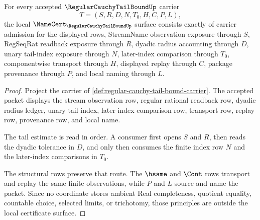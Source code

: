 \begin{theorem}
\label{thm:regular-cauchy-tail-bound-namecert-obligations}
For every accepted $\RegularCauchyTailBoundUp$ carrier
$$
T=(S,R,D,N,T_0,H,C,P,L),
$$
the local $\NameCert_{\RegularCauchyTailBoundUp}$ surface consists exactly of carrier admission for the displayed rows, StreamName observation exposure through $S$, RegSeqRat readback exposure through $R$, dyadic radius accounting through $D$, unary tail-index exposure through $N$, later-index comparison through $T_0$, componentwise transport through $H$, displayed replay through $C$, package provenance through $P$, and local naming through $L$.
\end{theorem}
\begin{proof}
Project the carrier of \autoref{def:regular-cauchy-tail-bound-carrier}. The accepted packet displays the stream observation row, regular rational readback row, dyadic radius ledger, unary tail index, later-index comparison row, transport row, replay row, provenance row, and local name.

The tail estimate is read in order. A consumer first opens $S$ and $R$, then reads the dyadic tolerance in $D$, and only then consumes the finite index row $N$ and the later-index comparisons in $T_0$.

The structural rows preserve that route. The $\hsame$ and $\Cont$ rows transport and replay the same finite observations, while $P$ and $L$ source and name the packet. Since no coordinate stores ambient Real completeness, quotient equality, countable choice, selected limits, or trichotomy, those principles are outside the local certificate surface.
\end{proof}

